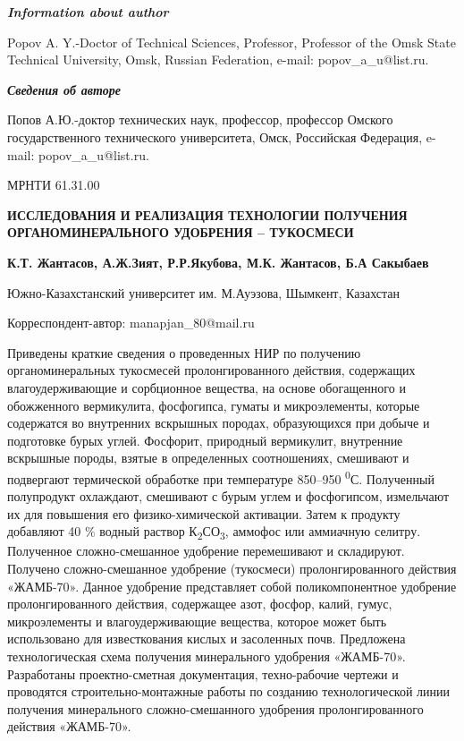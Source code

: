 \emph{\textbf{Information about author}}

Popov A. Y.-Doctor of Technical Sciences, Professor, Professor of the
Omsk State Technical University, Omsk, Russian Federation, e-mail:
popov\_a\_u@list.ru.

\emph{\textbf{Сведения об авторе}}

Попов А.Ю.-доктор технических наук, профессор, профессор Омского
государственного технического университета, Омск, Российская Федерация,
e-mail: popov\_a\_u@list.ru.

МРНТИ 61.31.00

\textbf{ИССЛЕДОВАНИЯ И РЕАЛИЗАЦИЯ ТЕХНОЛОГИИ ПОЛУЧЕНИЯ
ОРГАНОМИНЕРАЛЬНОГО УДОБРЕНИЯ -- ТУКОСМЕСИ}

\textbf{К.Т. Жантасов, А.Ж.Зият, Р.Р.Якубова, М.К. Жантасов, Б.А
Сакыбаев}

Южно-Казахстанский университет им. М.Ауэзова, Шымкент, Казахстан

Корреспондент-автор: manapjan\_80@mail.ru

Приведены краткие сведения о проведенных НИР по получению
органоминеральных тукосмесей пролонгированного действия, содержащих
влагоудерживающие и сорбционное вещества, на основе обогащенного и
обожженного вермикулита, фосфогипса, гуматы и микроэлементы, которые
содержатся во внутренних вскрышных породах, образующихся при добыче и
подготовке бурых углей. Фосфорит, природный вермикулит, внутренние
вскрышные породы, взятые в определенных соотношениях, смешивают и
подвергают термической обработке при температуре 850--950
\textsuperscript{0}С. Полученный полупродукт охлаждают, смешивают с
бурым углем и фосфогипсом, измельчают их для повышения его
физико-химической активации. Затем к продукту добавляют 40 \% водный
раствор К\textsubscript{2}СО\textsubscript{3}, аммофос или аммиачную
селитру. Полученное сложно-смешанное удобрение перемешивают и
складируют. Получено сложно-смешанное удобрение (тукосмеси)
пролонгированного действия «ЖАМБ-70». Данное удобрение представляет
собой поликомпонентное удобрение пролонгированного действия, содержащее
азот, фосфор, калий, гумус, микроэлементы и влагоудерживающие вещества,
которое может быть использовано для известкования кислых и засоленных
почв. Предложена технологическая схема получения минерального удобрения
«ЖАМБ-70». Разработаны проектно-сметная документация, техно-рабочие
чертежи и проводятся строительно-монтажные работы по созданию
технологической линии получения минерального сложно-смешанного удобрения
пролонгированного действия «ЖАМБ-70».

